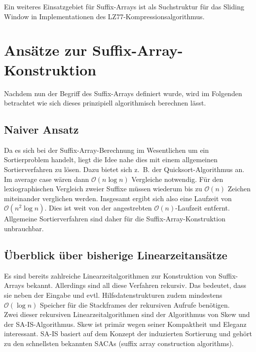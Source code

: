 \documentclass[twoside,11pt]{article}
\theoremstyle{break}
\begin{document}
Ein weiteres Einsatzgebiet für Suffix-Arrays ist als Suchstruktur für das Sliding Window in Implementationen des LZ77-Kompressionsalgorithmus.

\section{Ansätze zur Suffix-Array-Konstruktion}

Nachdem nun der Begriff des Suffix-Arrays definiert wurde, wird im Folgenden betrachtet wie sich dieses prinzipiell algorithmisch berechnen lässt.

\subsection{Naiver Ansatz}

Da es sich bei der Suffix-Array-Berechnung im Wesentlichen um ein Sortierproblem handelt, liegt die Idee nahe dies mit einem allgemeinen Sortierverfahren zu lösen. Dazu bietet sich z.~B. der Quicksort-Algorithmus an. Im average case wären dann $\mathcal{O}(n \log n)$ Vergleiche notwendig. Für den lexiographischen Vergleich zweier Suffixe müssen wiederum bis zu $\mathcal{O}(n)$ Zeichen miteinander verglichen werden. Insgesamt ergibt sich also eine Laufzeit von $\mathcal{O}(n^2 \log n)$. Dies ist weit von der angestrebten $\mathcal{O}(n)$-Laufzeit entfernt. Allgemeine Sortierverfahren sind daher für die Suffix-Array-Konstruktion unbrauchbar.

\subsection{Überblick über bisherige Linearzeitansätze}

Es sind bereits zahlreiche Linearzeitalgorithmen zur Konstruktion von Suffix-Arrays bekannt. Allerdings sind all diese Verfahren rekursiv. Das bedeutet, dass sie neben der Eingabe und evtl. Hilfsdatenstrukturen zudem mindestens $\mathcal{O}(\log n)$ Speicher für die Stackframes der rekursiven Aufrufe benötigen.\\

Zwei dieser rekursiven Linearzeitalgorithmen sind der Algorithmus von Skew und der SA-IS-Algorithmus. Skew ist primär wegen seiner Kompaktheit und Eleganz interessant. SA-IS basiert auf dem Konzept der induzierten Sortierung und gehört zu den schnellsten bekannten SACAs (suffix array construction algorithms).\\
\end{document}
